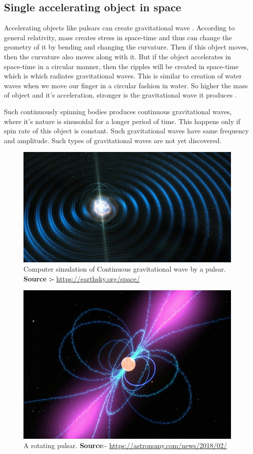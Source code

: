 \subsection{Single accelerating object in space}
 Accelerating objects like pulsars can create gravitational wave \cite{Creighton:2011zz}. According to general relativity, mass creates stress in space-time and thus can change the geometry of it by bending and changing the curvature. Then if this object moves, then the curvature also moves along with it. But if the object accelerates in space-time in a circular manner, then the ripples will be created in space-time which is which radiates gravitational waves. This is similar to creation of water waves when we move our finger in a circular fashion in water. So higher the mass of object and it's acceleration, stronger is the gravitational wave it produces \cite{Linear}.
 
 Such continuously spinning bodies produces continuous gravitational waves, where it's nature is sinusoidal for a longer period of time. This happens only if spin rate of this object is constant. Such gravitational waves have same frequency and amplitude. Such types of gravitational waves are not yet discovered.\\


\begin{figure}[h]
    \centering
    \includegraphics[scale = 0.35]{images.tex/continuous_gw.jpg}
    \caption{Computer simulation of Continuous gravitational wave by a pulsar. \\
    \textbf{Source :-} \url{https://earthsky.org/space/}}
\end{figure}

\begin{figure}[h]
    \centering
    \includegraphics[scale = 0.38]{images.tex/pulsar.jpg}
    \caption{A rotating pulsar.   \textbf{Source}:- \url{https://astronomy.com/news/2018/02/}}
\end{figure}

\pagebreak
